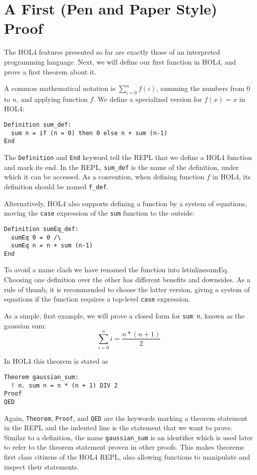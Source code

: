 \section{A First (Pen and Paper Style) Proof}\label{sec:hol_ex1}
%
The HOL4 features presented so far are exactly those of an interpreted
programming language.
Next, we will define our first function in HOL4, and prove a first theorem about
it.

A common mathematical notation is $\sum_{i=0}^n f (i)$,
summing the numbers from $0$ to $n$, and applying function $f$.
We define a specialized version for $f (x) = x$ in HOL4:

\begin{lstlisting}
Definition sum_def:
  sum n = if (n = 0) then 0 else n + sum (n-1)
End
\end{lstlisting}

The \lstinline{Definition} and \lstinline{End} keyword tell the REPL that we
define a HOL4 function and mark its end.
In the REPL, \lstinline{sum_def} is the name of the definition, under which it
can be accessed.
As a convention, when defining function $f$ in HOL4, its definition should be
named \lstinline{f_def}.

Alternatively, HOL4 also supports defining a function by a system of equations,
moving the \texttt{case} expression of the \lstinline{sum} function to the
outside:
\begin{lstlisting}
Definition sumEq_def:
  sumEq 0 = 0 /\
  sumEq n = n + sum (n-1)
End
\end{lstlisting}

To avoid a name clash we have renamed the function into lstinline{sumEq}.
Choosing one definition over the other has different benefits and downsides.
As a rule of thumb, it is recommended to choose the latter version, giving a
system of equations if the function requires a top-level \texttt{case}
expression.

As a simple, first example, we will prove a closed form for \lstinline{sum n},
known as the gaussian sum:
\[
  \sum_{i=0}^{n} i = \frac{n * (n + 1)}{2}
\]

In HOL4 this theorem is stated as

\begin{lstlisting}
Theorem gaussian_sum:
  ! n. sum n = n * (n + 1) DIV 2
Proof
QED
\end{lstlisting}

Again, \lstinline{Theorem}, \lstinline{Proof}, and \lstinline{QED} are the
keywords marking a theorem statement in the REPL and the indented line is
the statement that we want to prove.
Similar to a definition, the name \lstinline{gaussian_sum} is an identifier
which is used later to refer to the theorem statement proven in other proofs.
This makes theorems first class citizens of the HOL4 REPL, also allowing
functions to manipulate and inspect their statements.

